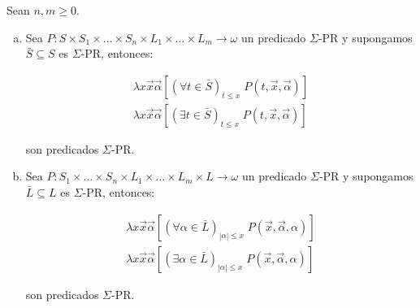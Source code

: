   \begin{lemma}
    \PN Sean $n, m \geq 0$.

    \begin{enumerate}[a)]
      \item Sea $P: S \times S_{1} \times \dotsc \times S_{n} \times L_{1} \times \dotsc \times L_{m} \rightarrow
        \omega$ un predicado $\Sigma$-PR y supongamos $\bar{S} \subseteq S$ es $\Sigma$-PR, entonces:

        \begin{eqnarray}
          \nonumber \lambda x\vec{x}\vec{\alpha} \left[(\forall t \in \bar{S})_{t\leq x} \; P(t,\vec{x},\vec{\alpha})
            \right] \\
          \nonumber \lambda x\vec{x}\vec{\alpha} \left[(\exists t \in \bar{S})_{t\leq x} \; P(t,\vec{x},\vec{\alpha})
            \right]
        \end{eqnarray}

        \PN son predicados $\Sigma$-PR.

      \item Sea $P: S_{1} \times \dotsc \times S_{n} \times L_{1} \times \dotsc \times L_{m} \times L \rightarrow
        \omega$ un predicado $\Sigma$-PR y supongamos $\bar{L} \subseteq L$ es $\Sigma$-PR, entonces:

        \begin{eqnarray}
          \nonumber \lambda x\vec{x}\vec{\alpha} \left[(\forall \alpha \in \bar{L})_{\left\vert \alpha \right\vert
            \leq x} \; P(\vec{x},\vec{\alpha},\alpha)\right] \\
          \nonumber \lambda x\vec{x}\vec{\alpha} \left[(\exists \alpha \in \bar{L})_{\left\vert \alpha \right\vert
            \leq x} \; P(\vec{x},\vec{\alpha},\alpha)\right]
        \end{eqnarray}

        \PN son predicados $\Sigma$-PR.
    \end{enumerate}
  \end{lemma}
